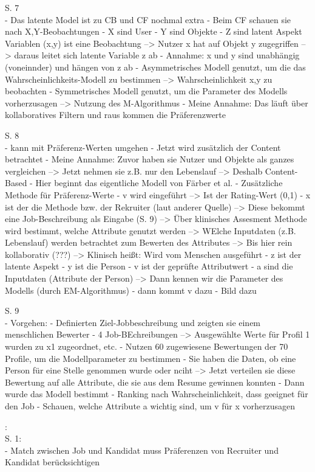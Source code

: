 S. 7\\
- Das latente Model ist zu CB und CF nochmal extra
- Beim CF schauen sie nach X,Y-Beobachtungen
- X sind User
- Y sind Objekte
- Z sind latent Aspekt Variablen
(x,y) ist eine Beobachtung --> Nutzer x hat auf Objekt y zugegriffen --> daraus leitet sich latente Variable z ab
- Annahme: x und y sind unabhängig (voneinnder) und hängen von z ab
- Asymmetrisches Modell genutzt, um die das Wahrscheinlichkeits-Modell zu bestimmen --> Wahrscheinlichkeit x,y zu beobachten
- Symmetrisches Modell genutzt, um die Parameter des Modells vorherzusagen --> Nutzung des M-Algorithmus
- Meine Annahme: Das läuft über kollaboratives Filtern und raus kommen die Präferenzwerte

S. 8\\
- kann mit Präferenz-Werten umgehen
- Jetzt wird zusätzlich der Content betrachtet
- Meine Annahme: Zuvor haben sie Nutzer und Objekte als ganzes vergleichen --> Jetzt nehmen sie z.B. nur den Lebenslauf --> Deshalb Content-Based
- Hier beginnt das eigentliche Modell von Färber et al.
- Zusätzliche Methode für Präferenz-Werte
- v wird eingeführt --> Ist der Rating-Wert (0,1)
- x ist der die Methode bzw. der Rekruiter (laut anderer Quelle) --> Diese bekommt eine Job-Beschreibung als Eingabe (S. 9) --> Über klinisches Assesment Methode wird bestimmt, welche Attribute genutzt werden --> WElche Inputdaten (z.B. Lebenslauf) werden betrachtet zum Bewerten des Attributes --> Bis hier rein kollaborativ (???) --> Klinisch heißt: Wird vom Menschen ausgeführt
- z ist der latente Aspekt
- y ist die Person
- v ist der geprüfte Attributwert
- a sind die Inputdaten (Attribute der Person)
--> Dann kennen wir die Parameter des Modells (durch EM-Algorithmus)
- dann kommt v dazu
- Bild dazu

S. 9\\
- Vorgehen:
- Definierten Ziel-Jobbeschreibung und zeigten sie einem menschlichen Bewerter
- 4 Job-BEchreibungen --> Ausgewählte Werte für Profil 1 wurden zu x1 zugeordnet, etc.
- Nutzen 60 zugewiesene Bewertungen der 70 Profile, um die Modellparameter zu bestimmen
- Sie haben die Daten, ob eine Person für eine Stelle genommen wurde oder nciht --> Jetzt verteilen sie diese Bewertung auf alle Attribute, die sie aus dem Resume gewinnen konnten
- Dann wurde das Modell bestimmt
- Ranking nach Wahrscheinlichkeit, dass geeignet für den Job
- Schauen, welche Attribute a wichtig sind, um v für x vorherzusagen

\textcite{malinowski:2006}:\\
S. 1:\\
- Match zwischen Job und Kandidat muss Präferenzen von Recruiter und Kandidat berücksichtigen

